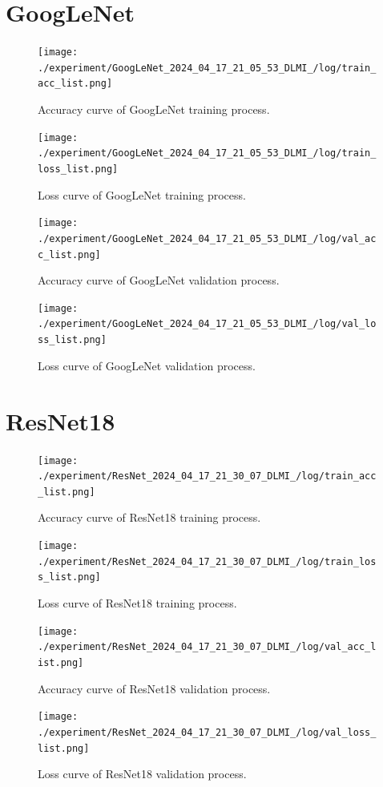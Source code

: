 \documentclass[final,5p,times,twocolumn,sort&compress]{elsarticle}
\begin{document}
\begin{appendices}
    \section{GoogLeNet}
    \begin{figure}[H]
        \centering
        \texttt{[image: ./experiment/GoogLeNet\_2024\_04\_17\_21\_05\_53\_DLMI\_/log/train\_acc\_list.png]}
        \caption{Accuracy curve of GoogLeNet training process.}
    \end{figure}
    \begin{figure}[H]
        \centering
        \texttt{[image: ./experiment/GoogLeNet\_2024\_04\_17\_21\_05\_53\_DLMI\_/log/train\_loss\_list.png]}
        \caption{Loss curve of GoogLeNet training process.}
    \end{figure}
    \begin{figure}[H]
        \centering
        \texttt{[image: ./experiment/GoogLeNet\_2024\_04\_17\_21\_05\_53\_DLMI\_/log/val\_acc\_list.png]}
        \caption{Accuracy curve of GoogLeNet validation process.}
    \end{figure}
    \begin{figure}[H]
        \centering
        \texttt{[image: ./experiment/GoogLeNet\_2024\_04\_17\_21\_05\_53\_DLMI\_/log/val\_loss\_list.png]}
        \caption{Loss curve of GoogLeNet validation process.}
    \end{figure}

    \section{ResNet18}
    \begin{figure}[H]
        \centering
        \texttt{[image: ./experiment/ResNet\_2024\_04\_17\_21\_30\_07\_DLMI\_/log/train\_acc\_list.png]}
        \caption{Accuracy curve of ResNet18 training process.}
    \end{figure}
    \begin{figure}[H]
        \centering
        \texttt{[image: ./experiment/ResNet\_2024\_04\_17\_21\_30\_07\_DLMI\_/log/train\_loss\_list.png]}
        \caption{Loss curve of ResNet18 training process.}
    \end{figure}
    \begin{figure}[H]
        \centering
        \texttt{[image: ./experiment/ResNet\_2024\_04\_17\_21\_30\_07\_DLMI\_/log/val\_acc\_list.png]}
        \caption{Accuracy curve of ResNet18 validation process.}
    \end{figure}
    \begin{figure}[H]
        \centering
        \texttt{[image: ./experiment/ResNet\_2024\_04\_17\_21\_30\_07\_DLMI\_/log/val\_loss\_list.png]}
        \caption{Loss curve of ResNet18 validation process.}
    \end{figure}

\end{appendices}
\end{document}

